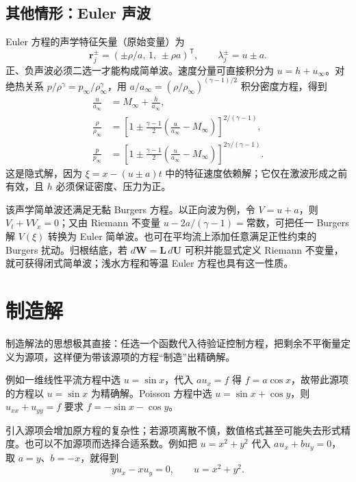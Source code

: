 \documentclass[11pt,a4paper,openany,fontset=none]{ctexbook}
\begin{document}
\subsection{其他情形：Euler 声波}

Euler 方程的声学特征矢量（原始变量）为
\begin{equation}
 \bm r_j^\pm=(\pm\rho/a,\,1,\,\pm\rho a)^{\mathsf T},\qquad
 \lambda_j^\pm=u\pm a. \tag{6.7.26--6.7.27}
\end{equation}
正、负声波必须二选一才能构成简单波。速度分量可直接积分为 $u=h+u_\infty$。对绝热关系 $p/\rho^\gamma=p_\infty/\rho_\infty^\gamma$，用 $a/a_\infty=(\rho/\rho_\infty)^{(\gamma-1)/2}$ 积分密度方程，得到
\begin{align}
 \frac{u}{a_\infty}&=M_\infty+\frac{h}{a_\infty},\\
 \frac{\rho}{\rho_\infty}&=\left[1\pm\frac{\gamma-1}{2}
 \left(\frac{u}{a_\infty}-M_\infty\right)\right]^{2/(\gamma-1)},\\
 \frac{p}{p_\infty}&=\left[1\pm\frac{\gamma-1}{2}
 \left(\frac{u}{a_\infty}-M_\infty\right)\right]^{2\gamma/(\gamma-1)}. \tag{6.7.38--6.7.40}
\end{align}
这是隐式解，因为 $\xi=x-(u\pm a)t$ 中的特征速度依赖解；它仅在激波形成之前有效，且 $h$ 必须保证密度、压力为正。

该声学简单波还满足无黏 Burgers 方程。以正向波为例，令 $V=u+a$，则 $V_t+VV_x=0$；又由 Riemann 不变量 $u-2a/(\gamma-1)=\text{常数}$，可把任一 Burgers 解 $V(\xi)$ 转换为 Euler 简单波。也可在平均流上添加任意满足正性约束的 Burgers 扰动。归根结底，若 $d\bm W=\bm L\,d\bm U$ 可积并能显式定义 Riemann 不变量，就可获得闭式简单波；浅水方程和等温 Euler 方程也具有这一性质。

\section{制造解}

制造解法的思想极其直接：任选一个函数代入待验证控制方程，把剩余不平衡量定义为源项，这样便为带该源项的方程“制造”出精确解。

例如一维线性平流方程中选 $u=\sin x$，代入 $au_x=f$ 得 $f=a\cos x$，故带此源项的方程以 $u=\sin x$ 为精确解。Poisson 方程中选 $u=\sin x+\cos y$，则 $u_{xx}+u_{yy}=f$ 要求 $f=-\sin x-\cos y$。

引入源项会增加原方程的复杂性；若源项离散不慎，数值格式甚至可能失去形式精度。也可以不加源项而选择合适系数。例如把 $u=x^2+y^2$ 代入 $au_x+bu_y=0$，取 $a=y$、$b=-x$，就得到
\begin{equation}
 yu_x-xu_y=0,\qquad u=x^2+y^2. \tag{6.8.8--6.8.9}
\end{equation}
\end{document}
